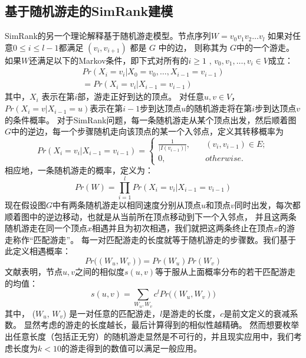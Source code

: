 \documentclass[master]{njuthesis}
\begin{document}
\subsection{基于随机游走的SimRank建模}
SimRank的另一个理论解释基于随机游走模型。节点序列$W=v_0v_1v_2\dots v_l$ 如果对任意$0 \leq i \leq l-1$都满足 $(v_i, v_{i+1})$ 都是 $G$ 中的边，
则称其为 $G$中的一个游走。如果$W$还满足以下的Markov条件，即下式对所有的$i \geq1$ ,   $v_0, v_1, \dots, v_i \in V$成立：
\begin{eqnarray}
\label{eq:three}
  Pr(X_i = v_i|X_{0} = v_{0},\dots, X_{i-1}  = v_{i-1}) \nonumber \\  
 =  Pr(X_i = v_i|X_{i-1} = v_{i-1})
\end{eqnarray}
其中，$X_i$ 表示在第$i$部，游走正好到达的顶点。
对任意$ u,v \in V$， $Pr(X_i=v|X_{i-1}=u)$表示在第$i-1$步到达顶点$u$的随机游走将在第$i$步到达顶点$v$的条件概率。
对于SimRank问题，每一条随机游走从某个顶点出发，然后顺着图$G$中的逆边，每一个步骤随机走向该顶点的某一个入邻点，定义其转移概率为
\begin{equation}
Pr(X_i=v_i|X_{i-1}=v_{i-1}) = \left\{
        \begin{array}{ll}
	\frac{1}{|I(v_{i-1})|}, & \quad (v_i, v_{i-1}) \in E; \\
	0,  &\quad otherwise.
        \end{array}
    \right.
	\label{eq:four}
\end{equation}
相应地，一条随机游走的概率，定义为：
 \begin{equation}
Pr(W) = \prod_{i=1}^{l}Pr(X_i=v_i|X_{i-1}=v_{i-1})
	\label{eq:seven}
\end{equation}
现在假设图$G$中有两条随机游走以相同速度分别从顶点$u$和顶点$v$同时出发，每次都顺着图中的逆边移动，也就是从当前所在顶点移动到下一个入邻点，
并且这两条随机游走在同一个顶点$x$相遇并且为初次相遇，我们就把这两条终止在顶点$x$的游走称作“匹配游走”。
每一对匹配游走的长度就等于随机游走的步骤数。我们基于此定义相遇概率：
 \begin{equation}
Pr\big((W_u, W_v)\big) = Pr(W_u)Pr(W_v)
	\label{eq:five}
\end{equation}
文献\cite{jeh2002simrank}表明，节点$u,v$之间的相似度$s(u,v)$等于服从上面概率分布的若干匹配游走的均值：
 \begin{equation}
s(u,v) = \sum\limits_{W_u, W_v} c^lPr\big((W_u, W_v)\big)
	\label{eq:six}
\end{equation}
其中， ($W_u$, $W_v$) 是一对任意的匹配游走，$l$是游走的长度，$c$是前文定义的衰减系数。
显然考虑的游走的长度越长，最后计算得到的相似性越精确。
然而想要枚举出任意长度（包括正无穷）的随机游走显然是不可行的，并且现实应用中，我们考虑长度为$k < 10$的游走得到的数值可以满足一般应用。
\end{document}
